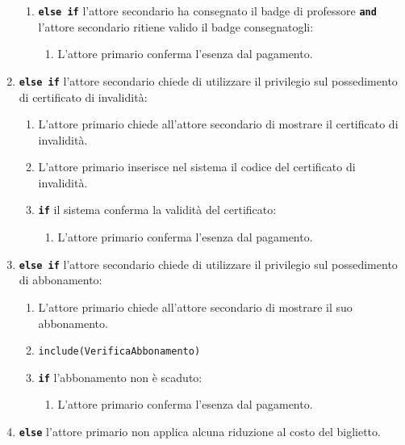 \documentclass{article}
\begin{document}
\begin{enumerate}[itemsep=8pt,parsep=0pt]
\begin{enumerate}[itemsep=8pt,parsep=0pt]
			\item   \texttt{\textbf{else if}} l'attore secondario ha consegnato il badge di professore \texttt{\textbf{and}} l'attore secondario ritiene valido il badge consegnatogli:
			        \begin{enumerate}[itemsep=8pt,parsep=0pt]
						\item L'attore primario conferma l'esenza dal pagamento.
					\end{enumerate}
        \end{enumerate}

    \item   \texttt{\textbf{else if}} l'attore secondario chiede di utilizzare il privilegio sul possedimento di certificato di invalidità:
        \begin{enumerate}[itemsep=8pt,parsep=0pt]
		\item L'attore primario chiede all'attore secondario di mostrare il certificato di invalidità.
		\item L'attore primario inserisce nel sistema il codice del certificato di invalidità.
			\item   \texttt{\textbf{if}} il sistema conferma la validità del certificato:
			        \begin{enumerate}[itemsep=8pt,parsep=0pt]
						\item L'attore primario conferma l'esenza dal pagamento.
					\end{enumerate}
        \end{enumerate}

    \item   \texttt{\textbf{else if}} l'attore secondario chiede di utilizzare il privilegio sul possedimento di abbonamento:
        \begin{enumerate}[itemsep=8pt,parsep=0pt]
		\item L'attore primario chiede all'attore secondario di mostrare il suo abbonamento.
	     \item   \texttt{include(VerificaAbbonamento)}
			\item   \texttt{\textbf{if}} l'abbonamento non è scaduto:
			        \begin{enumerate}[itemsep=8pt,parsep=0pt]
						\item L'attore primario conferma l'esenza dal pagamento.
					\end{enumerate}
        \end{enumerate}
        
        \item   \texttt{\textbf{else}} l'attore primario non applica alcuna riduzione al costo del biglietto.
        
\end{enumerate}
\end{document}
